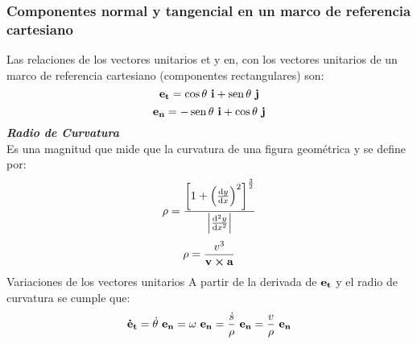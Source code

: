 \subsubsection*{Componentes normal y tangencial en un marco de referencia cartesiano}
Las relaciones de los vectores unitarios et y en, con los vectores unitarios de un marco de referencia cartesiano (componentes rectangulares) son:
$$ \vb{e_t}=\cos\theta \ \vb{i}+\sen\theta \ \vb{j} $$
$$ \vb{e_n}=-\sen\theta \ \vb{i}+\cos\theta \ \vb{j} $$
\textbf{\textit{Radio de Curvatura}} \\
Es una magnitud que mide que la curvatura de una figura geométrica y se define por:
$$ \rho=\frac{\left[1+\left(\dv{y}{x}\right)^2\right]^{\frac{3}{2}}}{\left|\dv[2]{y}{x}\right|} $$
$$ \rho=\frac{v^3}{\vb{v}\cross\vb{a}} $$
Variaciones de los vectores unitarios
A partir de la derivada de $\vb{e_t}$ y el radio de curvatura se cumple que:
$$ \vb{\dot{e}_t}=\dot{\theta} \ \vb{e_n}=\omega \ \vb{e_n}=\frac{\dot{s}}{\rho} \ \vb{e_n}=\frac{v}{\rho} \ \vb{e_n} $$
